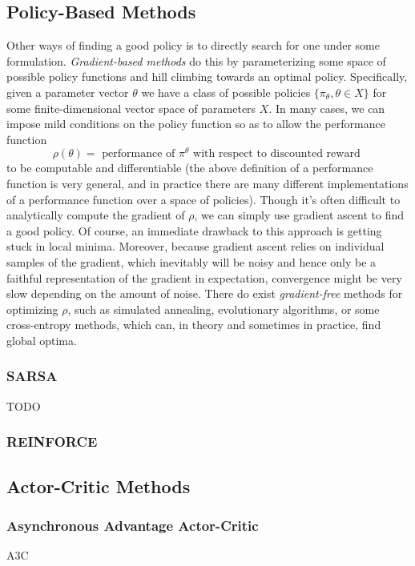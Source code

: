 \documentclass{article}
\begin{document}
\subsection{Policy-Based Methods}
Other ways of finding a good policy is to directly search for one under some formulation. \textit{Gradient-based methods} do this by parameterizing some space of possible policy functions and hill climbing towards an optimal policy. Specifically, given a parameter vector $ \theta $ we have a class of possible policies $ \{ \pi_\theta, \theta \in X \} $ for some finite-dimensional vector space of parameters $ X $. In many cases, we can impose mild conditions on the policy function so as to allow the performance function 
    $$ \rho(\theta) = \text{ performance of } \pi^\theta \text{ with respect to discounted reward } $$
to be computable and differentiable (the above definition of a performance function is very general, and in practice there are many different implementations of a performance function over a space of policies). Though it's often difficult to analytically compute the gradient of $ \rho $, we can simply use gradient ascent to find a good policy. Of course, an immediate drawback to this approach is getting stuck in local minima. Moreover, because gradient ascent relies on individual samples of the gradient, which inevitably will be noisy and hence only be a faithful representation of the gradient in expectation, convergence might be very slow depending on the amount of noise. There do exist \textit{gradient-free} methods for optimizing $ \rho $, such as simulated annealing, evolutionary algorithms, or some cross-entropy methods, which can, in theory and sometimes in practice, find global optima.

\subsubsection{SARSA}
TODO

\subsubsection{REINFORCE}

\subsection{Actor-Critic Methods}

\subsubsection{Asynchronous Advantage Actor-Critic}
A3C
\end{document}
